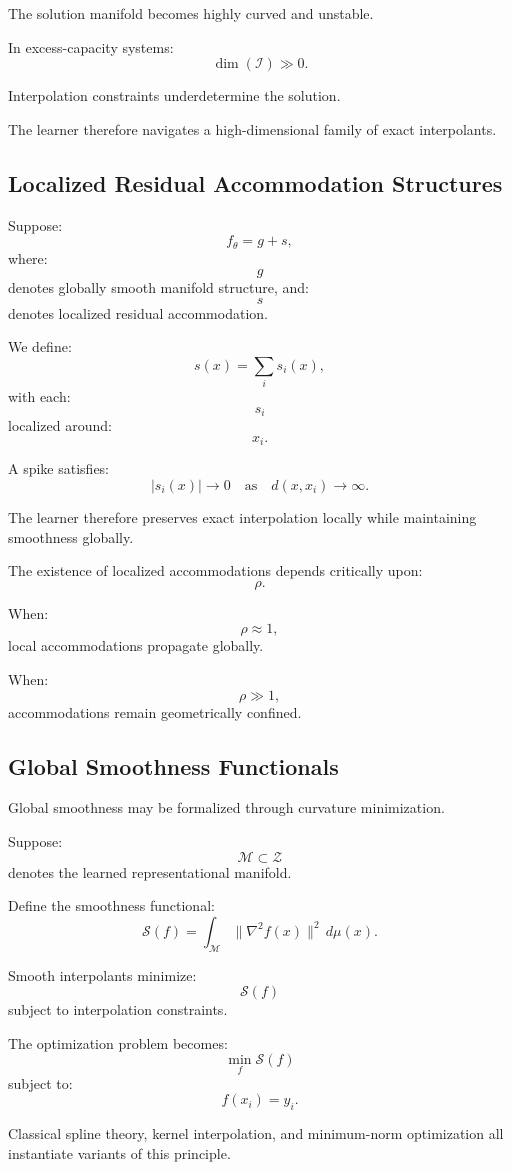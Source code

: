 \documentclass[12pt,a4paper]{article}
\begin{document}
The solution manifold becomes highly curved and unstable.

In excess-capacity systems:
\[
\dim(\mathcal{I})
\gg
0.
\]

Interpolation constraints underdetermine the solution.

The learner therefore navigates a high-dimensional family of exact interpolants.

\subsection{Localized Residual Accommodation Structures}

Suppose:
\[
f_\theta
=
g
+
s,
\]
where:
\[
g
\]
denotes globally smooth manifold structure,
and:
\[
s
\]
denotes localized residual accommodation.

We define:
\[
s(x)
=
\sum_i
s_i(x),
\]
with each:
\[
s_i
\]
localized around:
\[
x_i.
\]

A spike satisfies:
\[
|s_i(x)|
\rightarrow
0
\quad
\text{as}
\quad
d(x,x_i)
\rightarrow
\infty.
\]

The learner therefore preserves exact interpolation locally while maintaining smoothness globally.

The existence of localized accommodations depends critically upon:
\[
\rho.
\]

When:
\[
\rho
\approx
1,
\]
local accommodations propagate globally.

When:
\[
\rho
\gg
1,
\]
accommodations remain geometrically confined.

\subsection{Global Smoothness Functionals}

Global smoothness may be formalized through curvature minimization.

Suppose:
\[
\mathcal{M}
\subset
\mathcal{Z}
\]
denotes the learned representational manifold.

Define the smoothness functional:
\[
\mathcal{S}(f)
=
\int_{\mathcal{M}}
\|\nabla^2 f(x)\|^2
\,d\mu(x).
\]

Smooth interpolants minimize:
\[
\mathcal{S}(f)
\]
subject to interpolation constraints.

The optimization problem becomes:
\[
\min_f
\mathcal{S}(f)
\]
subject to:
\[
f(x_i)=y_i.
\]

Classical spline theory, kernel interpolation, and minimum-norm optimization all instantiate variants of this principle.
\end{document}

